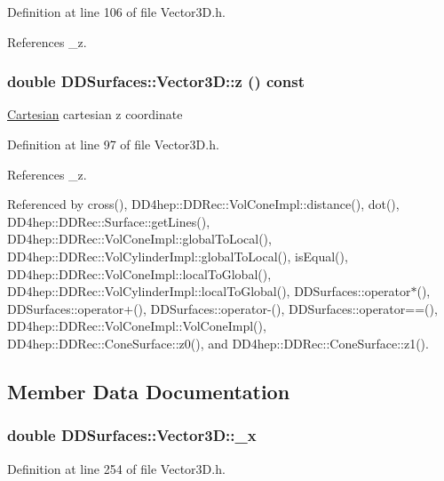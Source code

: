 Definition at line 106 of file Vector3D.h.

References \_\-z.\hypertarget{class_d_d_surfaces_1_1_vector3_d_a1aaceadb3e209d24aa14e9bd8683f6df}{
\subsubsection[{z}]{\setlength{\rightskip}{0pt plus 5cm}double DDSurfaces::Vector3D::z () const}}
\label{class_d_d_surfaces_1_1_vector3_d_a1aaceadb3e209d24aa14e9bd8683f6df}
\hyperlink{struct_d_d_surfaces_1_1_vector3_d_1_1_cartesian}{Cartesian} cartesian z coordinate 

Definition at line 97 of file Vector3D.h.

References \_\-z.

Referenced by cross(), DD4hep::DDRec::VolConeImpl::distance(), dot(), DD4hep::DDRec::Surface::getLines(), DD4hep::DDRec::VolConeImpl::globalToLocal(), DD4hep::DDRec::VolCylinderImpl::globalToLocal(), isEqual(), DD4hep::DDRec::VolConeImpl::localToGlobal(), DD4hep::DDRec::VolCylinderImpl::localToGlobal(), DDSurfaces::operator$\ast$(), DDSurfaces::operator+(), DDSurfaces::operator-\/(), DDSurfaces::operator==(), DD4hep::DDRec::VolConeImpl::VolConeImpl(), DD4hep::DDRec::ConeSurface::z0(), and DD4hep::DDRec::ConeSurface::z1().

\subsection{Member Data Documentation}
\hypertarget{class_d_d_surfaces_1_1_vector3_d_a9891648fe605155ece38f3b9c9dd687d}{
\subsubsection[{\_\-x}]{\setlength{\rightskip}{0pt plus 5cm}double {\bf DDSurfaces::Vector3D::\_\-x}}}
\label{class_d_d_surfaces_1_1_vector3_d_a9891648fe605155ece38f3b9c9dd687d}


Definition at line 254 of file Vector3D.h.

